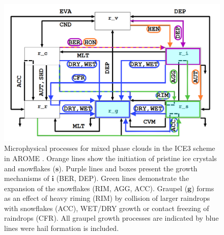 \begin{figure}[t]
	\centering
	\includegraphics[width=\textwidth]{./fig_MEPS/ICE3_scheme_copy}
	\caption{Microphysical processes for mixed phase clouds in the ICE3 scheme in AROME \citep[adapted from ][]{meteo_france_meso-nh_2009}. %
		Orange lines show the initiation of pristine ice crystals and snowflakes ($\mathbf{s}$). Purple  lines and boxes present the growth mechanisms of $\mathbf{i}$ (BER, DEP). Green lines demonstrate the expansion of the snowflakes (RIM, AGG, ACC). Graupel ($\mathbf{g}$) forms as an effect of heavy riming (RIM) by collision of larger raindrops with snowflakes (ACC), WET/DRY growth or contact freezing of raindrops (CFR). All graupel growth processes are indicated by blue lines were hail formation is included. 
	}\label{fig:ICE3_scheme}
\end{figure}